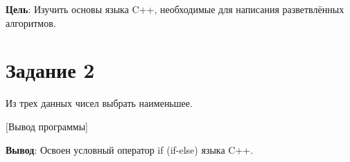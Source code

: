 \documentclass[variant=labwork]{bsuir}
\begin{document}
\maketitle
\mainmatter

\textbf{Цель}: Изучить основы языка C++, необходимые для написания разветвлённых
алгоритмов.

\section*{Задание 2}

Из трех данных чисел выбрать наименьшее.


[Вывод программы]


\textbf{Вывод}: Освоен условный оператор if (if-else) языка C++.
\end{document}
